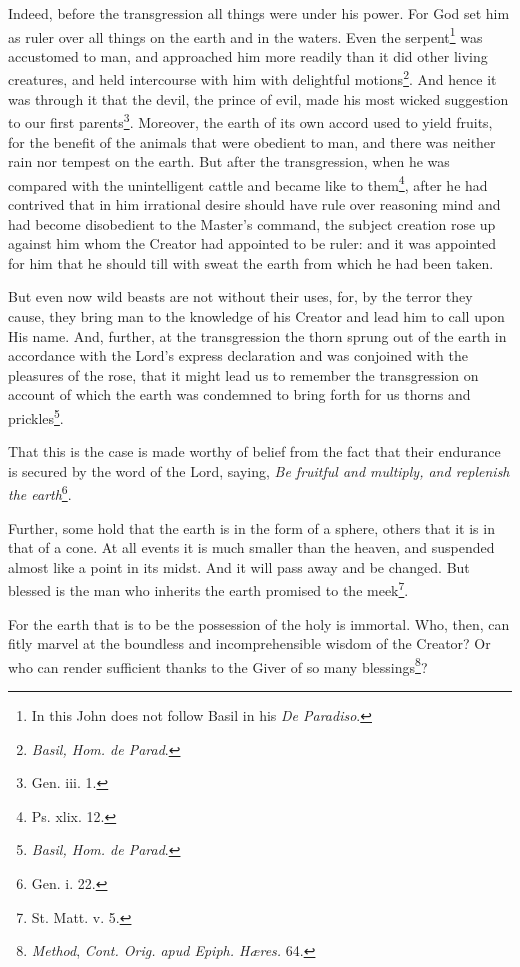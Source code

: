 Indeed, before the transgression all things were under his power. For God set him as ruler over all things on the earth and in the waters. Even the serpent\footnote{In this John does not follow Basil in his \emph{De Paradiso}.} was accustomed to man, and approached him more readily than it did other living creatures, and held intercourse with him with delightful motions\footnote{\emph{Basil, Hom. de Parad}.}. And hence it was through it that the devil, the prince of evil, made his most wicked suggestion to our first parents\footnote{Gen. iii. 1.}. Moreover, the earth of its own accord used to yield fruits, for the benefit of the animals that were obedient to man, and there was neither rain nor tempest on the earth. But after the transgression, when he was compared with the unintelligent cattle and became like to them\footnote{Ps. xlix. 12.}, after he had contrived that in him irrational desire should have rule over reasoning mind and had become disobedient to the Master’s command, the subject creation rose up against him whom the Creator had appointed to be ruler: and it was appointed for him that he should till with sweat the earth from which he had been taken.

But even now wild beasts are not without their uses, for, by the terror they cause, they bring man to the knowledge of his Creator and lead him to call upon His name. And, further, at the transgression the thorn sprung out of the earth in accordance with the Lord’s express declaration and was conjoined with the pleasures of the rose, that it might lead us to remember the transgression on account of which the earth was condemned to bring forth for us thorns and prickles\footnote{\emph{Basil, Hom. de Parad}.}.

That this is the case is made worthy of belief from the fact that their endurance is secured by the word of the Lord, saying, \emph{Be fruitful and multiply, and replenish the earth}\footnote{Gen. i. 22.}.

Further, some hold that the earth is in the form of a sphere, others that it is in that of a cone. At all events it is much smaller than the heaven, and suspended almost like a point in its midst. And it will pass away and be changed. But blessed is the man who inherits the earth promised to the meek\footnote{St. Matt. v. 5.}.

For the earth that is to be the possession of the holy is immortal. Who, then, can fitly marvel at the boundless and incomprehensible wisdom of the Creator? Or who can render sufficient thanks to the Giver of so many blessings\footnote{\emph{Method}, \emph{Cont. Orig. apud Epiph. Hæres.} 64.}?

